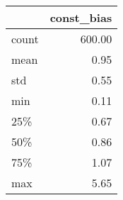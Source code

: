 \begin{tabular}{lr}
\toprule
{} &  const\_bias \\
\midrule
count &      600.00 \\
mean  &        0.95 \\
std   &        0.55 \\
min   &        0.11 \\
25\%   &        0.67 \\
50\%   &        0.86 \\
75\%   &        1.07 \\
max   &        5.65 \\
\bottomrule
\end{tabular}
